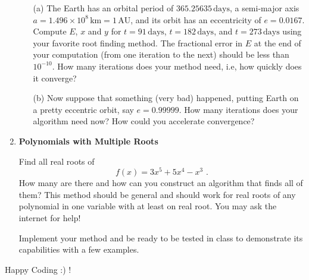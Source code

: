 \documentclass[11pt]{article}
\begin{document}
\begin{enumerate}
\begin{enumerate}
\item[(a)] The Earth has an orbital period of $365.25635\,\text{days}$,
a semi-major axis $a = 1.496\times 10^8\,\mathrm{km} = 1\,\mathrm{AU}$,
and its orbit has an eccentricity of $e = 0.0167$. Compute $E$, $x$ and $y$
for $t = 91\,\text{days}$, $t = 182\,\text{days}$, and $t = 273\,\text{days}$
using your favorite root finding method. The fractional error in $E$ at the end
of your computation (from one iteration to the next) should be less than
$10^{-10}$. How many iterations does your method need, i.e, how quickly does it
converge?

\item[(b)] Now suppose that something (very bad) happened,
  putting Earth on a pretty eccentric orbit, say $e = 0.99999$. How
  many iterations does your algorithm need now? How could you
  accelerate convergence?
\end{enumerate}

\item {\bf Polynomials with Multiple Roots}

Find all real roots of
\begin{equation}
f(x) = 3x^5 + 5x^4 - x^3\,\,.
\end{equation}
How many are there and how can you construct an algorithm that finds
all of them? This method should be general and should work for real
roots of any polynomial in one variable with at least on real
root. You may ask the internet for help!

Implement your method and be ready to be tested in class to demonstrate its capabilities
with a few examples.
\end{enumerate}

Happy Coding :) !
\end{document}
